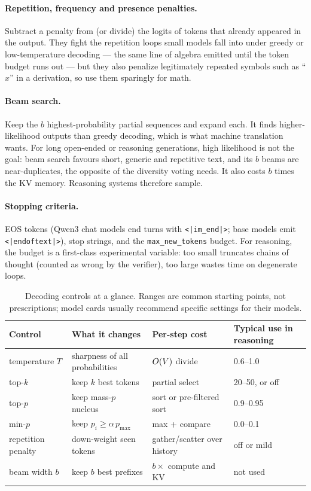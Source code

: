 \paragraph{Repetition, frequency and presence penalties.} Subtract a penalty from (or divide) the
logits of tokens that already appeared in the output. They fight the repetition loops small models
fall into under greedy or low-temperature decoding --- the same line of algebra emitted until the
token budget runs out --- but they also penalize legitimately repeated symbols such as
``$x$'' in a derivation, so use them sparingly for math.

\paragraph{Beam search.} Keep the $b$ highest-probability partial sequences and expand each. It finds
higher-likelihood outputs than greedy decoding, which is what machine translation wants. For long
open-ended or reasoning generations, high likelihood is not the goal: beam search favours short,
generic and repetitive text, and its $b$ beams are near-duplicates, the opposite of the diversity
voting needs. It also costs $b$ times the KV memory. Reasoning systems therefore sample.

\paragraph{Stopping criteria.} EOS tokens (Qwen3 chat models end turns with
\texttt{<|im\_end|>}; base models emit \texttt{<|endoftext|>}), stop strings, and the
\texttt{max\_new\_tokens} budget. For reasoning, the budget is a first-class experimental variable:
too small truncates chains of thought (counted as wrong by the verifier), too large wastes time on
degenerate loops.

\begin{table}[t]
\centering\small
\begin{tabular}{@{}llll@{}}
\toprule
Control & What it changes & Per-step cost & Typical use in reasoning \\
\midrule
temperature $T$ & sharpness of all probabilities & $O(V)$ divide & 0.6--1.0 \\
top-$k$ & keep $k$ best tokens & partial select & 20--50, or off \\
top-$p$ & keep mass-$p$ nucleus & sort or pre-filtered sort & 0.9--0.95 \\
min-$p$ & keep $p_i \ge \alpha\, p_{\max}$ & max + compare & 0.0--0.1 \\
repetition penalty & down-weight seen tokens & gather/scatter over history & off or mild \\
beam width $b$ & keep $b$ best prefixes & $b\times$ compute and KV & not used \\
\bottomrule
\end{tabular}
\caption{Decoding controls at a glance. Ranges are common starting points, not prescriptions; model
cards usually recommend specific settings for their models.}
\label{tab:scaling:controls}
\end{table}

